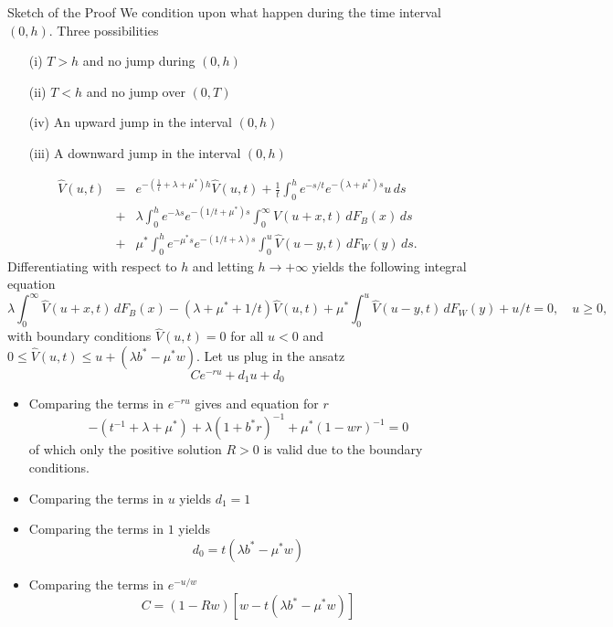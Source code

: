 \documentclass{beamer}
\def \w{\widehat}
\begin{document}
\begin{frame}[allowframebreaks]{Sketch of the Proof}
\scriptsize
We condition upon what happen during the time interval $(0,h)$. Three possibilities
\begin{itemize}
  \item[(i)] $T>h$ and no jump during $(0,h)$
  \item[(ii)] $T<h$ and no jump over $(0,T)$
  \item[(iv)] An upward jump in the interval $(0,h)$
  \item[(iii)] A downward jump in the interval $(0,h)$
\end{itemize}
  \begin{eqnarray*}\label{neu0}
      \w{V}(u,t)&=& e^{-(\frac{1}{t}+\lambda+\mu^\ast)h}\w{V}(u,t) + \frac{1}{t}\int_0^h e^{-{s}/{t}}e^{-(\lambda +\mu^\ast) s} u\,ds\\
      & +& \lambda\int_0^he^{-\lambda s} e^{-({1}/{t}+\mu^\ast) s} \int_0^\infty\w{V}(u+x,t)\,dF_{B}(x)\,ds\\
      &  +&\mu^\ast \int_0^he^{-\mu^\ast s} e^{-({1}/{t}+\lambda) s}\int_0^u \w{V}(u-y,t) \,dF_W(y)\,ds.
  \end{eqnarray*}
  Differentiating with respect to $h$ and letting $h\rightarrow +\infty$ yields the following integral equation
  \begin{equation} \label{inteq}
    \lambda\int_0^\infty\w{V}(u+x,t)\,dF_{B}(x)-(\lambda+\mu^\ast+{1}/{t})\w{V}(u,t)+\mu^\ast\int_0^u \w{V}(u-y,t) \,dF_W(y)+{u}/{t}=0,\quad u\ge 0,
  \end{equation}
  with boundary conditions $\w{V}(u,t)=0$ for all $u<0$ and $0\leq\w{V}(u,t)\leq u+(\lambda b^\ast - \mu^\ast w)$. Let us plug in the ansatz
  $$
  Ce^{-ru}+d_1u+d_0
  $$
  \begin{itemize}
    \item Comparing the terms in $e^{-r u}$ gives and equation for $r$
    $$
    -(t^{-1}+\lambda+\mu^\ast)+\lambda(1+b^\ast r)^{-1}+\mu^\ast(1-wr)^{-1}=0
    $$
    of which only the positive solution $R>0$ is valid due to the boundary conditions.
    \item Comparing the terms in $u$ yields $d_1 = 1$
    \item Comparing the terms in $1$ yields
    $$
    d_0 = t(\lambda b^\ast-\mu^\ast w)
    $$
    \item Comparing the terms in $e^{-u/w}$
    $$
    C = (1 - Rw)[w-t(\lambda b^\ast-\mu^\ast w)]
    $$
  \end{itemize}
\end{frame}
\end{document}
